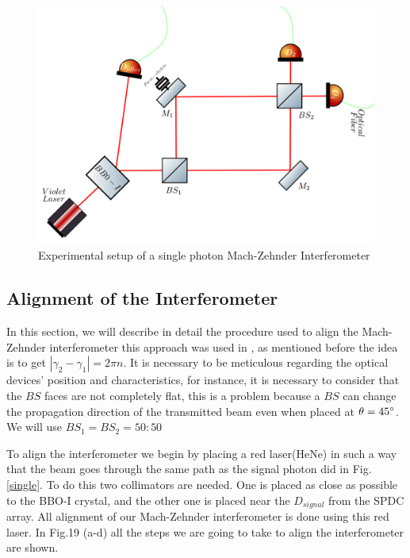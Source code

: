 \documentclass{book}
\begin{document}
\begin{figure}[!t]
\centering
\includegraphics[width=\linewidth]{images/machzehnder_single.png}
\caption{Experimental setup of a single photon Mach-Zehnder Interferometer}
\label{newsingle}
\end{figure}

\subsection{Alignment of the Interferometer}

In this section, we will describe in detail the procedure used to align the Mach-Zehnder interferometer this approach was used in \cite{zuri}, as mentioned before the idea is to get $|\gamma_{2}-\gamma_{1}|=2\pi n$. It is necessary to be meticulous regarding the optical devices' position and characteristics, for instance, it is necessary to consider that the $BS$ faces are not completely flat, this is a problem because a $BS$ can change the propagation direction of the transmitted beam even when placed at $\theta=45\degree$. We will use $BS_{1}=BS_{2}=50:50$

To align the interferometer we begin by placing a red laser(HeNe) in such a way that the beam goes through the same path as the signal photon did in Fig. \ref{single}. To do this two collimators are needed. One is placed as close as possible to the BBO-I crystal, and the other one is placed near the $D_{signal}$ from the SPDC array. All alignment of our Mach-Zehnder interferometer is done using this red laser. In Fig.19 (a-d) all the steps we are going to take to align the interferometer are shown.
\end{document}
